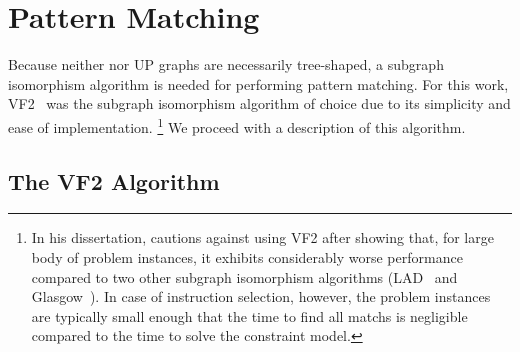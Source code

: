 \section{Pattern Matching}

Because neither  nor \glspl{UP graph} are necessarily
tree-shaped, a \gls{subgraph isomorphism} algorithm is needed for performing
\gls{pattern matching}.
%
For this work, \gls{VF2}~\cite{CordellaEtAl:2001} was the \gls{subgraph
  isomorphism} algorithm of choice due to its simplicity and ease of implementation.\!%
%
\footnote{%
  In his dissertation, \textcite{McCreesh:2017} cautions against using \gls{VF2}
  after showing that, for large body of problem instances, it exhibits
  considerably worse performance compared to two other \gls{subgraph
    isomorphism} algorithms (\gls{LAD}~\cite{Solnon:2010} and
  \gls{Glasgow}~\cite{McCreeshProsser:2015}).
  In case of \gls{instruction selection}, however, the problem instances are
  typically small enough that the time to find all \glspl{match} is negligible
  compared to the time to solve the \gls{constraint model}.
}
%
We proceed with a description of this algorithm.


\subsection{The VF2 Algorithm}

